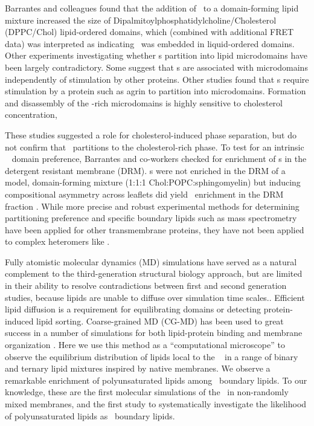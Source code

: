 Barrantes and colleagues\cite{Wenz2005} found that the addition of \nachr~to a domain-forming lipid mixture increased the size of Dipalmitoylphosphatidylcholine/Cholesterol (DPPC/Chol) lipid-ordered domains, which (combined with additional FRET data) was interpreted as indicating \nachr~was embedded in liquid-ordered domains.  Other experiments investigating whether \nachr s partition into lipid microdomains have been largely contradictory. Some\cite{Marchand2002,Stetzkowski-Marden2006,Willmann2006} suggest that \nachr s are associated with microdomains independently of stimulation by other proteins. Other studies\cite{Zhu2006,Campagna2006} found that \nachr s require stimulation by a protein such as agrin to partition into microdomains. Formation and disassembly of the \nachr-rich microdomains is highly sensitive to cholesterol concentration,\cite{Barrantes2007,Bruses2001,Marchand2002,Zhu2006,Pun2002}

These studies suggested a role for cholesterol-induced phase separation, but do not confirm that \nachr~partitions to the cholesterol-rich phase.  To test for an intrinsic \nachr~ domain preference, Barrantes and co-workers checked for enrichment of \nachr s in the detergent resistant membrane (DRM).   \nachr s were not enriched in the DRM of a model, domain-forming mixture (1:1:1  Chol:POPC:sphingomyelin) \cite{Bermdez_Partition_2010} but inducing compositional asymmetry across leaflets did yield \nachr~enrichment in the DRM fraction \cite{Perillo_Transbilayer_2016}.  While more precise and robust experimental methods for determining partitioning preference and specific boundary lipids such as mass spectrometry have been applied for other transmembrane proteins\cite{Gupta2018,Chorev2018}, they have not been applied to complex heteromers like \nachr.  

Fully atomistic molecular dynamics (MD) simulations\cite{Brannigan_Embedded_2008, Cheng2009, Hnin_A_2014, Carswell_Role_2015 } have served as a natural complement to the third-generation structural biology approach, but are limited in their ability to resolve contradictions between first and second generation studies, because lipids are unable to diffuse over simulation time scales.\cite{Ingolfsson2014,Bond2006,Parton2013,Goose2013,Scott2008}.   Efficient lipid diffusion is a requirement for equilibrating domains or detecting protein-induced lipid sorting.    Coarse-grained MD (CG-MD) has been used to great success in a number of simulations for both lipid-protein binding and membrane organization \cite{Bond2006,Scott2008,Parton2013,Goose2013,Iyer2018,Sodt2014}. Here we use this method as a ``computational microscope'' to observe the equilibrium distribution of lipids local to the \nachr~ in a range of binary and ternary lipid mixtures inspired by native membranes.   We observe a remarkable enrichment of polyunsaturated lipids among \nachr~boundary lipids. To our knowledge, these are the first molecular simulations of the \nachr~in non-randomly mixed membranes, and the first study to systematically investigate the likelihood of polyunsaturated lipids as \nachr~boundary lipids. 